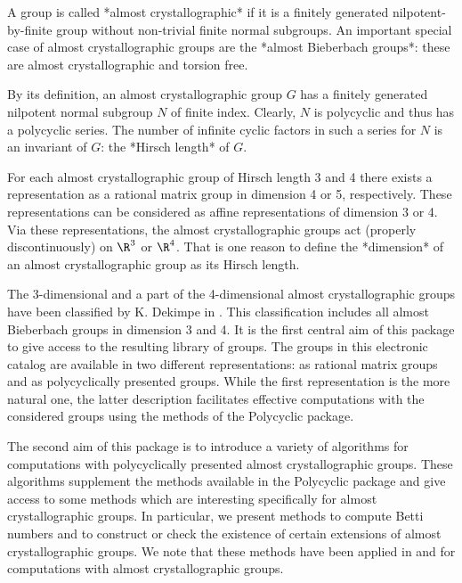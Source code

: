 

A group is called *almost crystallographic* if it is a finitely generated 
nilpotent-by-finite group without non-trivial finite normal subgroups. An 
important special case of almost crystallographic groups are the *almost 
Bieberbach groups*: these are almost crystallographic and torsion free. 

By its definition, an almost crystallographic group $G$ has a finitely 
generated nilpotent normal subgroup $N$ of finite index. Clearly, $N$ is 
polycyclic and thus has a polycyclic series. The number of infinite cyclic 
factors in such a series for $N$ is an invariant of $G$: the *Hirsch length* 
of $G$. 

For each almost crystallographic group of Hirsch length 3 and 4 there exists 
a representation as a rational matrix group in dimension 4 or 5, respectively. 
These representations can be considered as affine representations of dimension
3 or 4. Via these representations, the almost crystallographic groups act 
(properly discontinuously) on $\R^3$ or $\R^4$. That is one reason to define
the *dimension* of an almost crystallographic group as its Hirsch length.

The 3-dimensional and a part of the 4-dimensional almost crystallographic 
groups have been classified by K. Dekimpe in \cite{KD}. This classification 
includes all almost Bieberbach groups in dimension 3 and 4. It is the first
central aim of this package to give access to the resulting library of groups.
The groups in this electronic catalog are available in two different 
representations: as rational matrix groups and as polycyclically presented
groups. While the first representation is the more natural one, the latter
description facilitates effective computations with the considered groups
using the methods of the {\sf Polycyclic} package.

The second aim of this package is to introduce a variety of algorithms for
computations with polycyclically presented almost crystallographic groups. 
These algorithms supplement the methods available in the {\sf Polycyclic} 
package and give access to some methods which are interesting specifically 
for almost crystallographic groups. In particular, we present methods to
compute Betti numbers and to construct or check the existence of certain 
extensions of almost crystallographic groups. We note that these methods 
have been applied in \cite{DE1} and \cite{DE2} for computations with 
almost crystallographic groups.

